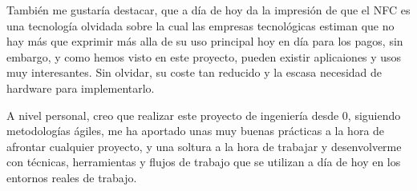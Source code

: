 También me gustaría destacar, que a día de hoy da la impresión de que el NFC es
una tecnología olvidada sobre la cual las empresas tecnológicas estiman que no
hay más que exprimir más alla de su uso principal hoy en día para los pagos, sin
embargo, y como hemos visto en este proyecto, pueden existir aplicaiones y usos
muy interesantes. Sin olvidar, su coste tan reducido y la escasa necesidad de
hardware para implementarlo.

A nivel personal, creo que realizar este proyecto de ingeniería desde 0,
siguiendo metodologías ágiles, me ha aportado unas muy buenas prácticas a la
hora de afrontar cualquier proyecto, y una soltura a la hora de trabajar y
desenvolverme con técnicas, herramientas y flujos de trabajo que se utilizan a
día de hoy en los entornos reales de trabajo. 
